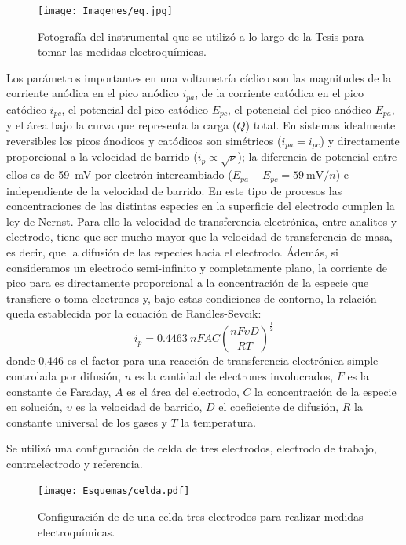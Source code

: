 	 		\begin{figure}[ht!]
			 		  \begin{center}
			 		  \texttt{[image: Imagenes/eq.jpg]}
			 		  \caption[Equipo para realizar la medidas electroquímicas]{Fotografía del instrumental que se utilizó a lo largo de la Tesis para tomar las medidas electroquímicas.}
			 		  \label{esq:eq}
			 		  \end{center}
			 		  \end{figure}		
	
	 Los parámetros importantes en una voltametría cíclico son las magnitudes de la corriente anódica en el pico anódico $i_{pa}$, de la corriente catódica en el pico catódico $i_{pc}$, el potencial del pico catódico $E_{pc}$, el potencial del pico anódico $E_{pa}$, y el área bajo la curva que representa la carga ($Q$) total. 
	 En sistemas idealmente reversibles los picos ánodicos y catódicos son simétricos ($i_{pa}=i_{pc}$) y directamente proporcional a la velocidad de barrido ($i_p \propto \sqrt{\nu}$); la diferencia de potencial entre ellos es de \SI{59}{\milli\volt} por electrón intercambiado ($E_{pa}-E_{pc}=\SI{59}{\milli\volt\per n}$) e independiente de la velocidad de barrido. En este tipo de procesos las concentraciones de las distintas especies en la superficie del electrodo cumplen la ley de Nernst.\cite{Wi2000,Villullas2000,Gosser} Para ello la velocidad de transferencia electrónica, entre analitos y electrodo, tiene que ser mucho mayor que la velocidad de transferencia de masa, es decir, que la difusión de las especies hacia el electrodo. Ádemás, si consideramos un electrodo semi-infinito y completamente plano, la corriente de pico para es directamente proporcional a la concentración de la especie que transfiere o toma electrones y, bajo estas condiciones de contorno, la relación queda establecida por la ecuación de Randles-Sevcik:
				\begin{equation}
					i_p=0.4463\: nFAC \left(\frac{nF\upsilon D}{RT}\right)^{\frac{1}{2}}
					\label{eq:randles-sevnic}
				\end{equation}
	 donde 0,446 es el factor para una reacción de transferencia electrónica simple controlada por difusión, $n$ es la cantidad de electrones involucrados, $F$ es la constante de Faraday, $A$ es el área del electrodo, $C$ la concentración de la especie en solución, $\upsilon$ es la velocidad de barrido, $D$ el coeficiente de difusión, $R$ la constante universal de los gases y $T$ la temperatura.

	 Se utilizó una configuración de celda de tres electrodos, electrodo de trabajo, contraelectrodo y referencia. 
	 				\begin{figure}[!ht]
			 		  \begin{center}
			 		  \texttt{[image: Esquemas/celda.pdf]}
			 		  \caption[Configuración de una celda de tres electrodos]{Configuración de de una celda tres electrodos para realizar medidas electroquímicas.}
			 		  \label{fig:celda}
			 		  \end{center}
			 		  \end{figure}

